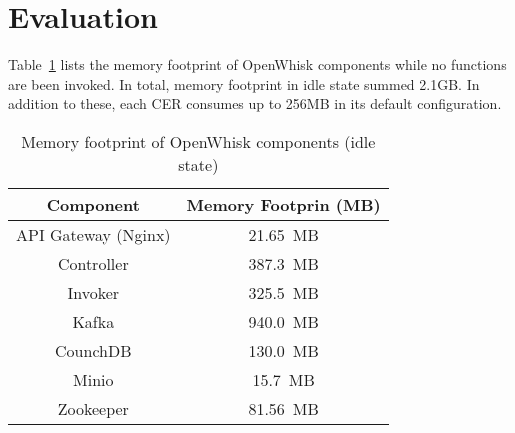 \section{Evaluation}\label{sec:evaluation}



Table~\ref{tab:OPENWHISK_MEM_FOOTPRINT} lists the memory footprint of OpenWhisk components while no functions are been invoked. In total, memory footprint in idle state summed  2.1GB. In addition to these, each CER consumes up to 256MB in its default configuration.


\begin{table}[tbp]
\caption{Memory footprint of OpenWhisk components (idle state)}
\label{tab:OPENWHISK_MEM_FOOTPRINT}
\centering
\begin{tabular}{|c|c|}
\hline
\textbf{Component} & \textbf{Memory Footprin (MB)}\\
\hline
API Gateway (Nginx) & 21.65~MB\\
\hline
Controller          & 387.3~MB\\
\hline
Invoker             & 325.5~MB\\
\hline
Kafka               & 940.0~MB\\
\hline
CounchDB            & 130.0~MB\\
\hline
Minio               & 15.7~MB\\
\hline
Zookeeper           & 81.56~MB\\
\hline
\end{tabular}
\end{table}